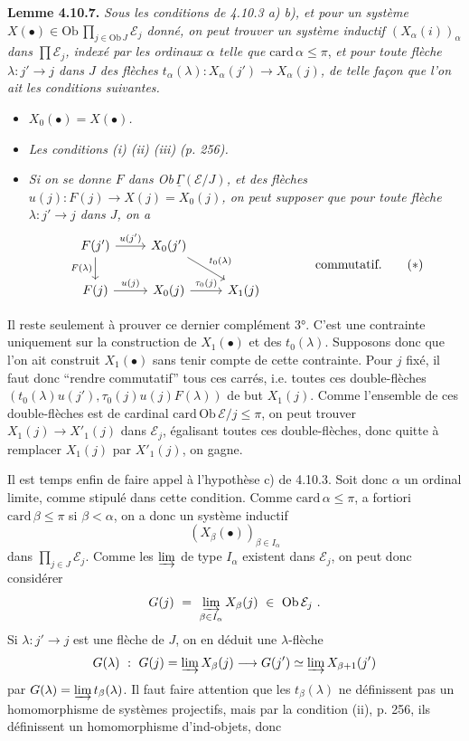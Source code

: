 \documentclass[11pt]{article}
\newcommand{\msp}[1]{\marginpar{\footnotesize [#1]}}
\newcommand{\uGamma}{\underline{\Gamma}}
\newcommand{\Ob}{\mathrm{Ob}\,}
\newcommand{\card}{\mathrm{card}\,}
\begin{document}
\textbf{Lemme 4.10.7.} \textit{Sous les conditions de 4.10.3 a) b), et pour un système $X(\bullet)\in\Ob\prod_{j\in\Ob J}\mathcal{E}_j$ donné, on peut trouver un système inductif $(X_\alpha(i))_\alpha$ dans $\prod\mathcal{E}_j$, indexé par les ordinaux $\alpha$ telle que} $\card\alpha\leqslant\pi$, \textit{et pour toute flèche $\lambda : j'\longrightarrow j$ dans $J$ des flèches $t_\alpha(\lambda) : X_\alpha(j')\longrightarrow X_\alpha(j)$, de telle façon que l'on ait les conditions suivantes.} %
\begin{itemize}[leftmargin=3em]
\item[\textit{1°)}] \textit{$X_0(\bullet)=X(\bullet)$.}
\item[\textit{2°)}] \textit{Les conditions (i) (ii) (iii) (p. 256).}
\item[\textit{3°)}] \textit{Si on se donne $F$ dans \textup{Ob}$\,\uGamma(\mathcal{E}/J)$, et des flèches $u(j) : F(j)\longrightarrow X(j)=X_0(j)$, on peut supposer que pour toute flèche $\lambda : j'\longrightarrow j$ dans $J$, on a}
\[
\begin{tikzcd}
F(j') \arrow[r,"u(j')"] \arrow[d,"F(\lambda)"'] & X_0(j') \arrow[dr,"t_0(\lambda)"] & \\
F(j) \arrow[r,"u(j)"] & X_0(j) \arrow[r,"\tau_0(j)"] & X_1(j)
\end{tikzcd}
\qquad\qquad \text{commutatif.}
\tag*{$(*)$}
\]
\end{itemize}

\msp{260}
Il reste seulement à prouver ce dernier complément 3°. C'est une contrainte uniquement sur la construction de $X_1(\bullet)$ et des $t_0(\lambda)$. Supposons donc que l'on ait construit $X_1(\bullet)$ sans tenir compte de cette contrainte. Pour $j$ fixé, il faut donc “rendre commutatif” tous ces carrés, i.e. toutes ces double-flèches $(t_0(\lambda)u(j'),\tau_0(j)u(j)F(\lambda))$ de but $X_1(j)$. Comme l'ensemble de ces double-flèches est de cardinal $\card\Ob\mathcal{E}/j\leqslant\pi$, on peut trouver $X_1(j)\longrightarrow X'_1(j)$ dans $\mathcal{E}_j$, égalisant toutes ces double-flèches, donc quitte à remplacer $X_1(j)$ par $X'_1(j)$, on gagne.

\msp{261}
Il est temps enfin de faire appel à l'hypothèse c) de 4.10.3. Soit donc $\alpha$ un ordinal limite, comme stipulé dans cette condition. Comme $\card\alpha\leqslant\pi$, a fortiori $\card\beta\leqslant\pi$ si $\beta<\alpha$, on a donc un système inductif
\[
(X_\beta(\bullet))_{\beta\in I_\alpha}
\]
dans $\prod_{j\in J}\mathcal{E}_j$. Comme les $\varinjlim$ de type $I_\alpha$ existent dans $\mathcal{E}_j$, on peut donc considérer
\[
G(j)\ =\ \varinjlim_{\beta\in I_\alpha} X_\beta(j)\ \in\ \Ob\mathcal{E}_j\ .
\]
Si $\lambda : j'\longrightarrow j$ est une flèche de $J$, on en déduit une $\lambda$-flèche
\[
G(\lambda)\ :\ G(j)=\varinjlim X_\beta(j) \longrightarrow G(j')\simeq\varinjlim X_{\beta+1}(j')
\]
par $G(\lambda)=\varinjlim t_\beta(\lambda)$. Il faut
\msp{262}
faire attention que les $t_\beta(\lambda)$ ne définissent pas un homomorphisme de systèmes projectifs, mais par la condition (ii), p. 256, ils définissent un homomorphisme d'ind-objets, donc
\end{document}

